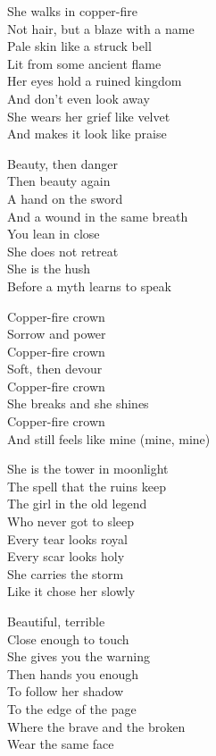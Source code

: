 \begin{lyrics}
She walks in copper-fire\\
Not hair, but a blaze with a name\\
Pale skin like a struck bell\\
Lit from some ancient flame\\
Her eyes hold a ruined kingdom\\
And don't even look away\\
She wears her grief like velvet\\
And makes it look like praise

Beauty, then danger\\
Then beauty again\\
A hand on the sword\\
And a wound in the same breath\\
You lean in close\\
She does not retreat\\
She is the hush\\
Before a myth learns to speak

Copper-fire crown\\
Sorrow and power\\
Copper-fire crown\\
Soft, then devour\\
Copper-fire crown\\
She breaks and she shines\\
Copper-fire crown\\
And still feels like mine (mine, mine)

She is the tower in moonlight\\
The spell that the ruins keep\\
The girl in the old legend\\
Who never got to sleep\\
Every tear looks royal\\
Every scar looks holy\\
She carries the storm\\
Like it chose her slowly

Beautiful, terrible\\
Close enough to touch\\
She gives you the warning\\
Then hands you enough\\
To follow her shadow\\
To the edge of the page\\
Where the brave and the broken\\
Wear the same face


\end{lyrics}
